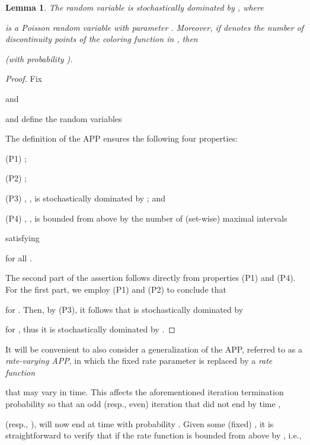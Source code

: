 \documentclass[11pt]{article}
\def\LongVersion{}
\def\LongVersionEnd{}
\def\ShortVersion{}
\def\ShortVersionEnd{}
\newtheorem{lemma}[theorem]{Lemma}
\theoremstyle{definition}
\theoremstyle{plain}
\newtheorem{lemma}[theorem]{Lemma}
\theoremstyle{definition}
\theoremstyle{plain}
\newtheorem{lemma}{Lemma}[section]
\theoremstyle{definition}
\theoremstyle{plain}
\newenvironment{DenseEnumerate}[1][\theenumi.]
{\begin{list}{#1}{\usecounter{enumi}
\itemsep 0pt \parsep 0pt \leftmargin 5mm \labelwidth 5mm \parskip 0pt \topsep
0pt}}
{\end{list}}
\begin{document}
\ShortVersion \sloppy \ShortVersionEnd
\begin{lemma} \label{lemma:APP-bound-number-meaningful}
The random variable  is stochastically dominated by
,
where
\LongVersion 
\LongVersionEnd \ShortVersion 
\ShortVersionEnd is a Poisson random variable with parameter
.
Moreover, if  denotes the number of discontinuity points of the coloring
function  in , then

(with probability ).
\end{lemma}
\ShortVersion \par\fussy \ShortVersionEnd
\LongVersion \begin{proof}
Fix

and

and define the random variables

The definition of the APP ensures the following four properties:
\begin{DenseEnumerate}

\item[(P1)]
;

\item[(P2)]
;

\item[(P3)]
, , is stochastically dominated by ; and

\item[(P4)]
, , is bounded from above by the number of (set-wise)
maximal intervals

satisfying

for all .

\end{DenseEnumerate}
The second part of the assertion follows directly from properties (P1) and
(P4).
For the first part, we employ (P1) and (P2) to conclude that

for .
Then, by (P3), it follows that  is stochastically dominated by

for ,
thus it is stochastically dominated by
.
\end{proof}
\LongVersionEnd 

\LongVersion It will be convenient to also consider a generalization of the APP, referred to
as a \emph{rate-varying APP}, in which the fixed rate parameter  is
replaced by a \emph{rate function}

that may vary in time.
This affects the aforementioned iteration termination probability  so
that an odd (resp., even) iteration  that did not end by time
,

(resp.,
),
will now end at time  with probability
.
Given some (fixed)
,
it is straightforward to verify that if the rate function  is
bounded from above by , i.e.,
\end{document}
